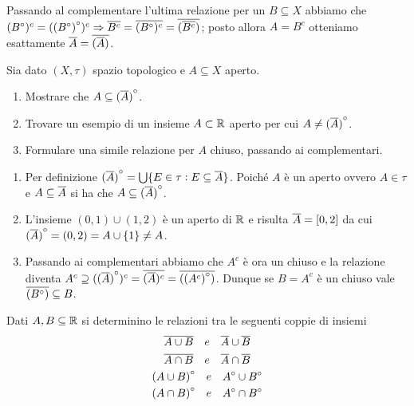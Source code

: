 \documentclass[a4paper]{article}\par \usepackage{style}\par
\begin{document}
Passando al complementare l'ultima relazione per un $ B \subseteq X $ abbiamo che $ ({B}^{\circ})^c = ({({B}^{\circ})}^{\circ})^c \Rightarrow \overline{B^c} = \overline{({B}^{\circ})^c} = \overline{(\overline{B^c})} $; posto allora $ A = B^c $ otteniamo esattamente $ \overline{A} = \overline{(\overline{A})} $.\par \begin{es}
  Sia dato $ (X, \tau) $ spazio topologico e $ A \subseteq X $ aperto.
  \begin{enumerate}[label = (\roman*)]
  \item Mostrare che $ A \subseteq {(\overline{A})}^{\circ} $.
  \item Trovare un esempio di un insieme $ A \subset \mathbb{R} $ aperto per cui $ A \neq {(\overline{A})}^{\circ} $.
  \item Formulare una simile relazione per $ A $ chiuso, passando ai complementari.
  \end{enumerate}
\end{es}\par \begin{enumerate}[label = (\roman*)]
\item Per definizione $ {(\overline{A})}^{\circ} = \bigcup \{E \in \tau : E \subseteq \overline{A}\} $. Poiché $ A $ è un aperto ovvero $ A \in \tau $ e $ A \subseteq \overline{A} $ si ha che $ A \subseteq {(\overline{A})}^{\circ} $.
\item L'insieme $ (0, 1) \cup (1, 2) $ è un aperto di $ \mathbb{R} $ e risulta $ \overline{A} = [0, 2] $ da cui $ {(\overline{A})}^{\circ} = (0, 2) = A \cup \{1\} \neq A $.
\item Passando ai complementari abbiamo che $ A^c $ è ora un chiuso e la relazione diventa $ A^c \supseteq ({(\overline{A})}^{\circ})^c = \overline{(\overline{A})^c} = \overline{({(A^c)}^{\circ})} $. Dunque se $ B = A^c $ è un chiuso vale $ \overline{({B}^{\circ})} \subseteq B $.
\end{enumerate}\par \begin{es}
  Dati $ A, B \subseteq \mathbb{R} $ si determinino le relazioni tra le seguenti coppie di insiemi
  \begin{gather*}
    \overline{A \cup B} \quad e \quad \overline{A} \cup \overline{B}   \\
    \overline{A \cap B} \quad e \quad \overline{A} \cap \overline{B}   \\
    {(A \cup B)}^{\circ} \quad e \quad {A}^{\circ} \cup {B}^{\circ} \\
    {(A \cap B)}^{\circ} \quad e \quad {A}^{\circ} \cap {B}^{\circ}
  \end{gather*}

\end{es}
\end{document}
